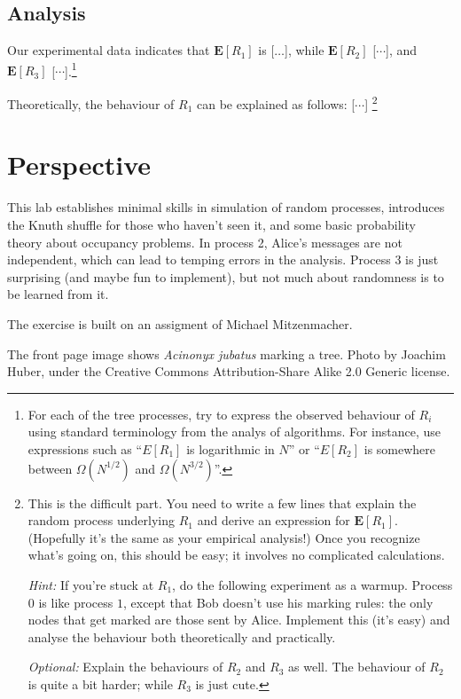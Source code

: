 \documentclass{tufte-handout}
\begin{document}
\subsection{Analysis}

Our experimental data indicates that $\mathbf E [R_1]$ is [$\ldots$],
while $\mathbf E[R_2]$ [$\cdots$], and $\mathbf E[R_3]$
[$\cdots$].\footnote{For each of the tree processes, try to express
  the observed behaviour of $R_i$ using standard terminology from the
  analys of algorithms.
  For instance, use expressions such as ``$E[R_1]$ is logarithmic in
  $N$'' or ``$E[R_2]$ is somewhere between $\Omega(N^{1/2})$ and
  $\Omega(N^{3/2})$''.}

Theoretically, the behaviour of $R_1$ can be explained as follows: [$\cdots$] \footnote{This
  is the difficult part.
  You need to write a few lines that explain the random process
  underlying $R_1$ and derive an expression for $\mathbf E[R_1]$.
  (Hopefully it's the same as your empirical analysis!)
  Once you recognize what's going on, this should be easy; it involves
  no complicated calculations.

  \emph{Hint:} If you're stuck at $R_1$, do the following experiment
  as a warmup.
  Process $0$ is like process $1$, except that Bob doesn't use his
  marking rules: the only nodes that get marked are those sent by
  Alice. Implement this (it's easy) and analyse the behaviour both
  theoretically and practically.

  \emph{Optional:} Explain the
  behaviours of $R_2$ and $R_3$ as well.
  The behaviour of $R_2$ is quite a bit harder; while $R_3$ is just
  cute.
}



\newpage
\section{Perspective}

This lab establishes minimal skills in simulation of random processes,
introduces the Knuth shuffle for those who haven't seen it, and some
basic probability theory about occupancy problems.
In process 2, Alice's messages are not independent, which can lead to
temping errors in the analysis.
Process 3 is just surprising (and maybe fun to implement), but not
much about randomness is to be learned from it.

The exercise is built on an assigment of Michael
Mitzenmacher.

The front page image shows \emph{Acinonyx jubatus} marking a
tree. Photo by Joachim Huber, under the Creative Commons Attribution-Share
Alike 2.0 Generic license.
\end{document}
